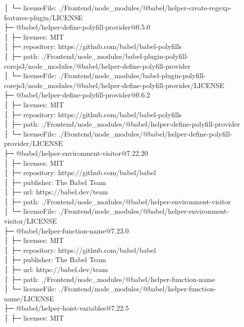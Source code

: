 │  └─ licenseFile: ./Frontend/node\_modules/@babel/helper-create-regexp-features-plugin/LICENSE\\
├─ @babel/helper-define-polyfill-provider@0.5.0\\
│  ├─ licenses: MIT\\
│  ├─ repository: https://github.com/babel/babel-polyfills\\
│  ├─ path: ./Frontend/node\_modules/babel-plugin-polyfill-corejs3/node\_modules/@babel/helper-define-polyfill-provider\\
│  └─ licenseFile: ./Frontend/node\_modules/babel-plugin-polyfill-corejs3/node\_modules/@babel/helper-define-polyfill-provider/LICENSE\\
├─ @babel/helper-define-polyfill-provider@0.6.2\\
│  ├─ licenses: MIT\\
│  ├─ repository: https://github.com/babel/babel-polyfills\\
│  ├─ path: ./Frontend/node\_modules/@babel/helper-define-polyfill-provider\\
│  └─ licenseFile: ./Frontend/node\_modules/@babel/helper-define-polyfill-provider/LICENSE\\
├─ @babel/helper-environment-visitor@7.22.20\\
│  ├─ licenses: MIT\\
│  ├─ repository: https://github.com/babel/babel\\
│  ├─ publisher: The Babel Team\\
│  ├─ url: https://babel.dev/team\\
│  ├─ path: ./Frontend/node\_modules/@babel/helper-environment-visitor\\
│  └─ licenseFile: ./Frontend/node\_modules/@babel/helper-environment-visitor/LICENSE\\
├─ @babel/helper-function-name@7.23.0\\
│  ├─ licenses: MIT\\
│  ├─ repository: https://github.com/babel/babel\\
│  ├─ publisher: The Babel Team\\
│  ├─ url: https://babel.dev/team\\
│  ├─ path: ./Frontend/node\_modules/@babel/helper-function-name\\
│  └─ licenseFile: ./Frontend/node\_modules/@babel/helper-function-name/LICENSE\\
├─ @babel/helper-hoist-variables@7.22.5\\
│  ├─ licenses: MIT\\
